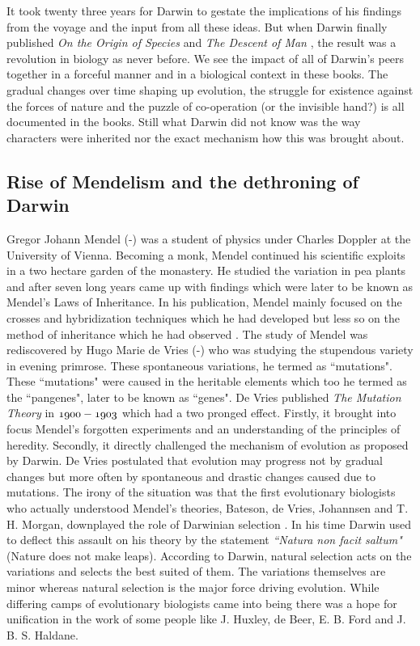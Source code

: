 \documentclass[oneside,11pt,a4paper]{book}
\begin{document}
It took twenty three years for Darwin to gestate the implications of his findings from the voyage and the input from all these ideas.
But when Darwin finally published \textit{On the Origin of Species} \citep{darwin:1859fn} and \textit{The Descent of Man} \citep{darwin:1871dm}, the result was a revolution in biology as never before.
We see the impact of all of Darwin's peers together in a forceful manner and in a biological context in these books.
The gradual changes over time shaping up evolution, the struggle for existence against the forces of nature and the puzzle of co-operation (or the invisible hand?) is all documented in the books.
Still what Darwin did not know was the way characters were inherited nor the exact mechanism how this was brought about.

\subsection{Rise of Mendelism and the dethroning of Darwin}
Gregor Johann Mendel (-) was a student of physics under Charles Doppler at the University of Vienna.
Becoming a monk, Mendel continued his scientific exploits in a two hectare garden of the monastery.
He studied the variation in pea plants and after seven long years came up with findings which were later to be known as Mendel's Laws of Inheritance.
In his publication, Mendel mainly focused on the crosses and hybridization techniques which he had developed but less so on the method of inheritance which he had observed \citep{mendel:1866to}.
The study of Mendel was rediscovered by Hugo Marie de Vries (-) who was studying the stupendous variety in evening primrose.
These spontaneous variations, he termed as ``mutations".
These ``mutations" were caused in the heritable elements which too he termed as the ``pangenes", later to be known as ``genes".
De Vries published \textit{The Mutation Theory} in $\oldstylenums{1900}-\oldstylenums{1903}$ 
which had a two pronged effect.
Firstly, it brought into focus Mendel's forgotten experiments and an understanding of the principles of heredity.
Secondly, it directly challenged the mechanism of evolution as proposed by Darwin.
De Vries postulated that evolution may progress not by gradual changes but more often by spontaneous and drastic changes caused due to mutations.
The irony of the situation was that the first evolutionary biologists who actually understood Mendel's theories, Bateson, de Vries, Johannsen and T. H. Morgan, downplayed the role of Darwinian selection \citep{mayr:1980bo}.
In his time Darwin used to deflect this assault on his theory by the statement \textit{``Natura non facit saltum"} (Nature does not make leaps).
According to Darwin, natural selection acts on the variations and selects the best suited of them.
The variations themselves are minor whereas natural selection is the major force driving evolution.
While differing camps of evolutionary biologists came into being there was a hope for unification in the work of some people like J. Huxley, de Beer, E. B. Ford and J. B. S. Haldane.
\end{document}
